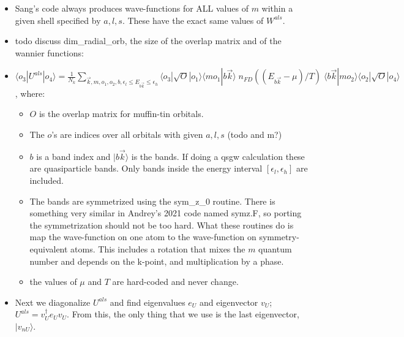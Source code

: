 \documentclass[aps,prb,singlecolumn,preprintnumbers,amsmath,amssymb]{revtex4}
\begin{document}
\begin{itemize}
\begin{itemize}
\item Sang's code always produces wave-functions for ALL values of $m$ within a given shell specified by $a , l, s$. These have the exact same values of $W^{als}$.
\item todo discuss dim\_radial\_orb, the size of the overlap matrix and of the wannier functions: %
\item $\langle o_3 | U^{als} | o_4 \rangle = \frac{1}{N_k} \sum_{\vec{k}, m, o_1, o_2, b, \epsilon_l \le E_{b \vec{k}} \le \epsilon_h} \langle o_3 | \sqrt{O} | o_1 \rangle  \langle m  o_1 | b \vec{k} \rangle \; n_{FD}((E_{b \vec{k}} - \mu)/T)  \; \langle b \vec{k} | m o_2 \rangle \langle o_2 | \sqrt{O} | o_4 \rangle $, where:
\begin{itemize}
\item $O$ is the overlap matrix for muffin-tin orbitals.
\item The $o$'s are indices over all orbitals with given $a,l,s$ (todo and m?) %
\item $b$ is a band index and $|b \vec{k} \rangle$ is the  bands. If doing a qsgw calculation these are quasiparticle bands. Only bands inside the energy interval $\left[ \epsilon_l, \epsilon_h \right] $ are included.  
\item The bands are symmetrized using the sym\_z\_0 routine.  There is something very similar in Andrey's 2021 code named symz.F, so porting the symmetrization should not be too hard. What these routines do is map the wave-function on one atom to the wave-function on symmetry-equivalent atoms.  This includes a rotation that mixes the $m$ quantum number and depends on the k-point, and multiplication by a phase.
\item the values of $\mu$ and $T$ are hard-coded and never change.
\end{itemize} 
 \item Next we diagonalize $U^{als}$ and find eigenvalues $e_U$ and eigenvector $v_U$; $U^{als} = v_U^\dagger e_U v_U$.  From this, the only thing that we use is the last eigenvector, $ | v_{nU} \rangle $.

\end{itemize}
\end{itemize}
\end{document}
